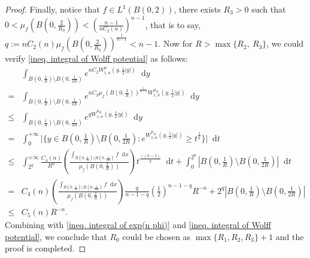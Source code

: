 \documentclass[12pt]{amsart}
\theoremstyle{plain}
\theoremstyle{definition}
\theoremstyle{remark}     %
\numberwithin{equation}{section}
\newcommand{\dd}{\mathop{}\!\mathrm{d}}%
\newcommand{\dx}{\mathop{}\!\mathrm{d}x}
\newcommand{\dy}{\mathop{}\!\mathrm{d}y}
\begin{document}
\begin{proof}
    Finally, notice that $f\in L^1(B(0,2))$, there exists $R_3>0$ such that $0<\mu_f(B(0,\frac{2}{R_3}))<(\frac{n-1}{nC_2(n)})^{n-1}$, that is to say, $q:=nC_2(n)\mu_f(B(0,\frac{2}{R_3}))^{\frac{1}{n-1}}<n-1$. Now for $R>\max\{R_2,\ R_3\}$, we could verify \cref{ineq. integral of Wolff potential} as follows:
    \begin{align*}
        &\int_{B(0,\frac{1}{R})\setminus B(0,\frac{1}{2R})} e^{nC_2W_{1,n}^{\mu}(y,\frac{1}{2}|y|)}\dy\\
        =&\int_{B(0,\frac{1}{R})\setminus B(0,\frac{1}{2R})} e^{nC_2 \mu_f(B(0,\frac{2}{R}))^{\frac{1}{n-1}} W_{1,n}^{\mu_R}(y,\frac{1}{2}|y|)}\dy\\
        \leq&\int_{B(0,\frac{1}{R})\setminus B(0,\frac{1}{2R})}
        e^{qW_{1,n}^{\mu_R}(y,\frac{1}{2}|y|)}\dy
        \\
        =&\int_0^{+\infty}
        \Big|\Big\{
        y\in B(0,\frac{1}{R})\setminus B(0,\frac{1}{2R}):
        e^{W_{1,n}^{\mu_R}(y,\frac{1}{2}|y|)}
        \geq 
        t^{\frac{1}{q}}
        \Big\}\Big|\dd t\\
        \leq& \int_{2^{q}}^{+\infty}
        \frac{C_4(n)}{R^n}
         \left(\frac{\int_{B(0,\frac{1}{R})\setminus B(0,\frac{1}{2R})} f\dx}{\mu_f(B(0,\frac{2}{R}))}\right)
         t^{\frac{-(n-1)}{q}}
         \dd t
         +\int_0^{2^{q}}
         |B(0,\frac{1}{R})\setminus B(0,\frac{1}{2R})|\dd t\\
         =&C_4(n)
         \left(\frac{\int_{B(0,\frac{1}{R})\setminus B(0,\frac{1}{2R})} f\dx}{\mu_f(B(0,\frac{2}{R}))}\right)
         \frac{q}{n-1-q}
         \left(\frac{1}{2}\right)^{n-1-q}
         R^{-n}
         +2^{q}
         |B(0,\frac{1}{R})\setminus B(0,\frac{1}{2R})|\\
         \leq& C_5(n)R^{-n}.
    \end{align*}
    Combining with \cref{ineq. integral of exp(n phi)} and \cref{ineq. integral of Wolff potential}, we conclude that $R_0$ could be chosen as $\max\{R_1,R_2,R_3\}+1$ and the proof is completed.
\end{proof}
\end{document}
